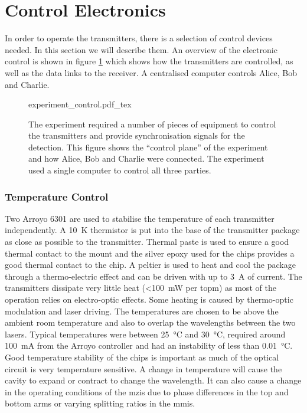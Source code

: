\section{Control Electronics}

In order to operate the transmitters, there is a selection of control devices needed. In this section we will describe them. An overview of the electronic control is shown in figure \ref{fig:exp_control} which shows how the transmitters are controlled, as well as the data links to the receiver. A centralised computer controls Alice, Bob and Charlie. 

\begin{figure}[t]
	\centering
	\large
	\def\svgwidth{\textwidth} 
	{experiment_control.pdf_tex}
	\caption[Control electronic schematic of the MDI-QKD experiment]{The experiment required a number of pieces of equipment to control the transmitters and provide synchronisation signals for the detection. This figure shows the ``control plane'' of the experiment and how Alice, Bob and Charlie were connected. The experiment used a single computer to control all three parties.}
	\label{fig:exp_control}
\end{figure}

\subsubsection{Temperature Control}

Two Arroyo 6301 are used to stabilise the temperature of each transmitter independently. A \SI{10}{K} thermistor is put into the base of the transmitter package as close as possible to the transmitter. Thermal paste is used to ensure a good thermal contact to the mount and the silver epoxy used for the chips provides a good thermal contact to the chip. A peltier is used to heat and cool the package through a thermo-electric effect and can be driven with up to \SI{3}{A} of current. The transmitters dissipate very little heat (\SI{<100}{mW} per \ac{topm}) as most of the operation relies on electro-optic effects. Some heating is caused by thermo-optic modulation and laser driving. The temperatures are chosen to be above the ambient room temperature and also to overlap the wavelengths between the two lasers. Typical temperatures were between \SI{25}{\celsius} and \SI{30}{\celsius}, required around \SI{100}{mA} from the Arroyo controller and had an instability of less than \SI{0.01}{\celsius}. Good temperature stability of the chips is important as much of the optical circuit is very temperature sensitive. A change in temperature will cause the cavity to expand or contract to change the wavelength. It can also cause a change in the operating conditions of the \acp{mzi} due to phase differences in the top and bottom arms or varying splitting ratios in the \acp{mmi}.


